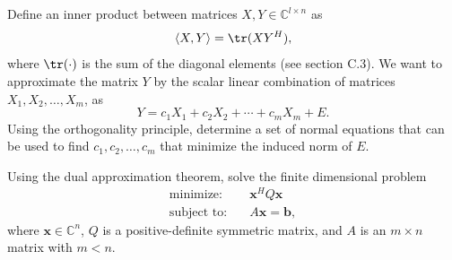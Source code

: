 \documentclass[11pt]{article}
\begin{document}
\pagebreak

\begin{homeworkProblem}

    Define an inner product between matrices $X, Y \in \mathbb{C}^{l \times n}$ as
    \[
        \langle X, Y \rangle = \tr(XY^H),
    \]
    where $\tr(\cdot)$ is the sum of the diagonal elements (see section C.3). We want to approximate
    the matrix $Y$ by the scalar linear combination of matrices $X_1, X_2, \dots, X_m$, as
    \[
        Y = c_1 X_1 + c_2 X_2 + \cdots + c_m X_m + E.
    \]
    Using the orthogonality principle, determine a set of normal equations that can be used to
    find $c_1, c_2, \dots, c_m$ that minimize the induced norm of $E$. \\

    \solution

\end{homeworkProblem}

\pagebreak

\begin{homeworkProblem}

    Using the dual approximation theorem, solve the finite dimensional problem
    \begin{align*}
        \text{minimize:} \quad   & \mathbf{x}^H Q \mathbf{x}  \\
        \text{subject to:} \quad & A \mathbf{x} = \mathbf{b},
    \end{align*}
    where $\mathbf{x} \in \mathbb{C}^n$, $Q$ is a positive-definite symmetric matrix, and $A$ is an $m \times n$ matrix with
    $m < n$. \\

    \solution

\end{homeworkProblem}
\end{document}
